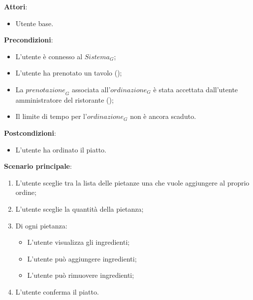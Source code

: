 \textbf{Attori}:
\begin{itemize}
    \item Utente base.
\end{itemize}
\textbf{Precondizioni}:
\begin{itemize}
    \item L'utente è connesso al $\textit{Sistema}_G$; 
    \item L'utente ha prenotato un tavolo ();
    \item La $\textit{prenotazione}_G$ associata all'$\textit{ordinazione}_G$ è stata accettata dall'utente amministratore del ristorante ();
    \item Il limite di tempo per l'$\textit{ordinazione}_G$ non è ancora scaduto.
\end{itemize}
\textbf{Postcondizioni}:
\begin{itemize}
    \item L'utente ha ordinato il piatto.
\end{itemize}
\textbf{Scenario principale}:
\begin{enumerate}
    \item L'utente sceglie tra la lista delle pietanze una che vuole aggiungere al proprio ordine;
    \item L'utente sceglie la quantità della pietanza;
    \item Di ogni pietanza:
    \begin{itemize}
        \item L'utente visualizza gli ingredienti;
        \item L'utente può aggiungere ingredienti;
        \item L'utente può rimuovere ingredienti;
    \end{itemize}
    \item L'utente conferma il piatto.
\end{enumerate}
\newpage

